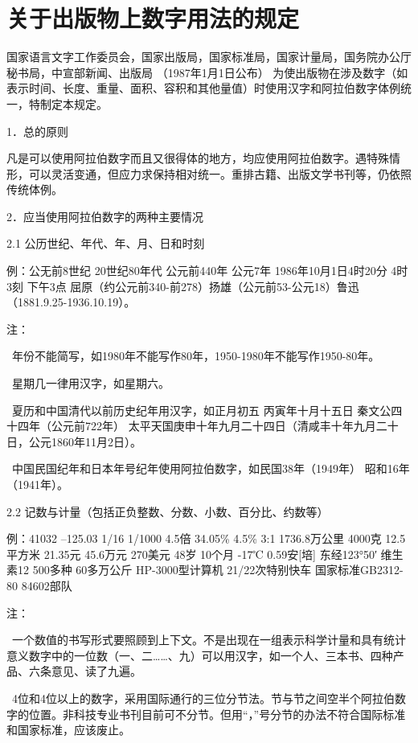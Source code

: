 \chapter{关于出版物上数字用法的规定}

国家语言文字工作委员会，国家出版局，国家标准局，国家计量局，国务院办公厅秘书局，中宣部新闻、出版局
（1987年1月1日公布）
为使出版物在涉及数字（如表示时间、长度、重量、面积、容积和其他量值）时使用汉字和阿拉伯数字体例统一，特制定本规定。

1．总的原则

凡是可以使用阿拉伯数字而且又很得体的地方，均应使用阿拉伯数字。遇特殊情形，可以灵活变通，但应力求保持相对统一。重排古籍、出版文学书刊等，仍依照传统体例。

2．应当使用阿拉伯数字的两种主要情况

2.1  公历世纪、年代、年、月、日和时刻

例：公无前8世纪  20世纪80年代  公元前440年  公元7年  1986年10月1日4时20分  4时3刻  下午3点  屈原（约公元前340-前278）扬雄（公元前53-公元18）鲁迅（1881.9.25-1936.10.19）。

注：

~年份不能简写，如1980年不能写作80年，1950-1980年不能写作1950-80年。

~星期几一律用汉字，如星期六。

~夏历和中国清代以前历史纪年用汉字，如正月初五  丙寅年十月十五日  秦文公四十四年（公元前722年）  太平天国庚申十年九月二十四日（清咸丰十年九月二十日，公元1860年11月2日）。

~中国民国纪年和日本年号纪年使用阿拉伯数字，如民国38年（1949年）  昭和16年（1941年）。

2.2  记数与计量（包括正负整数、分数、小数、百分比、约数等）

例：41032 –125.03  1/16  1/1000  4.5倍  34.05\%  4.5\%  3:1  1736.8万公里  4000克  12.5平方米  21.35元  45.6万元  270美元  48岁  10个月  -17℃  0.59安[培]  东经123°50′  维生素12  500多种  60多万公斤  HP-3000型计算机  21/22次特别快车  国家标准GB2312-80  84602部队

注：

~一个数值的书写形式要照顾到上下文。不是出现在一组表示科学计量和具有统计意义数字中的一位数（一、二……、九）可以用汉字，如一个人、三本书、四种产品、六条意见、读了九遍。

~4位和4位以上的数字，采用国际通行的三位分节法。节与节之间空半个阿拉伯数字的位置。非科技专业书刊目前可不分节。但用“，”号分节的办法不符合国际标准和国家标准，应该废止。


